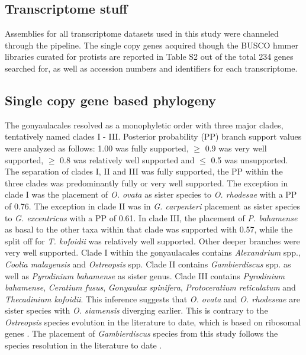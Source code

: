 \documentclass[12pt]{article}
\begin{document}
\subsection*{Transcriptome stuff}
Assemblies for all transcriptome datasets used in this study were channeled through the pipeline. 
The single copy genes acquired though the BUSCO hmmer libraries curated for protists are reported in Table S2 out of the total 234 genes searched for, as well as accession numbers and identifiers for each transcriptome.
\subsection*{Single copy gene based phylogeny}
The gonyaulacales resolved as a monophyletic order with three major clades, tentatively named clades I - III. 
Posterior probability (PP) branch support values were analyzed as follows: 1.00 was fully supported, $\geq$ 0.9 was very well supported, $\geq$ 0.8 was relatively well supported and $\leq$ 0.5 was unsupported.
The separation of clades I, II and III was fully supported, the PP within the three clades was predominantly fully or very well supported. 
The exception in clade I was the placement of \emph{O. ovata} as sister species to \emph{O. rhodesae} with a PP of 0.76. 
The exception in clade II was in \emph{G. carpenteri} placement as sister species to \emph{G. excentricus} with a PP of 0.61. In clade III, the placement of \emph{P. bahamense} as basal to the other taxa within that clade was supported with 0.57, while the split off for \emph{T. kofoidii} was relatively well supported.
Other deeper branches were very well supported.
Clade I within the gonyaulacales contains \emph{Alexandrium} spp., \emph{Coolia malayensis} and \emph{Ostreopsis} spp. 
Clade II contains \emph{Gambierdiscus} spp. as well as \emph{Pyrodinium bahamense} as sister genus. 
Clade III contains \emph{Pyrodinium bahamense}, \emph{Ceratium fusus}, \emph{Gonyaulax spinifera}, \emph{Protoceratium reticulatum} and \emph{Thecadinium kofoidii}. 
This inference suggests that \emph{O. ovata} and \emph{O. rhodeseae} are sister species with \emph{O. siamensis} diverging earlier. 
This is contrary to the \emph{Ostreopsis} species evolution in the literature to date, which is based on ribosomal genes \cite{verma2016molecular}. 
The placement of \emph{Gambierdiscus} species from this study follows the species resolution in the literature to date \cite{kretzschmar2017characterization}. 
\end{document}
